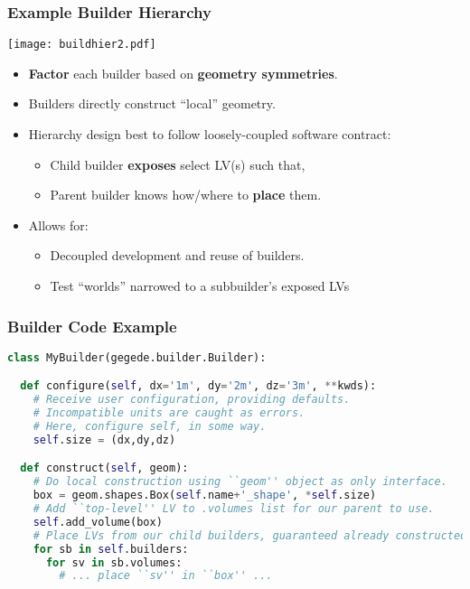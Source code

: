 \documentclass[10pt,xcolor=dvipsnames]{beamer}
\begin{document}
\begin{frame}[fragile]
  \frametitle{Example Builder Hierarchy}
  \vspace{-5mm}
  \begin{center}
    \texttt{[image: buildhier2.pdf]}    
  \end{center}
  \vspace{-5mm}
  
  \begin{itemize}\footnotesize
  \item \textbf{Factor} each builder based on \textbf{geometry symmetries}.
  \item Builders directly construct ``local'' geometry.
  \item Hierarchy design best to follow loosely-coupled software contract:
    \begin{itemize}\scriptsize
    \item Child builder \textbf{exposes} select LV(s) such that,
    \item Parent builder knows how/where to \textbf{place} them.
    \end{itemize}
  \item Allows for:
    \begin{itemize}\scriptsize
    \item Decoupled development and reuse of builders.
    \item Test ``worlds'' narrowed to a subbuilder's exposed LVs
    \end{itemize}
  \end{itemize}
\end{frame}

\begin{frame}[fragile]
  \frametitle{Builder Code Example}

  \footnotesize

  \begin{lstlisting}[language=Python]
class MyBuilder(gegede.builder.Builder):

  def configure(self, dx='1m', dy='2m', dz='3m', **kwds):
    # Receive user configuration, providing defaults.
    # Incompatible units are caught as errors.
    # Here, configure self, in some way.
    self.size = (dx,dy,dz)

  def construct(self, geom):
    # Do local construction using ``geom'' object as only interface.
    box = geom.shapes.Box(self.name+'_shape', *self.size)
    # Add ``top-level'' LV to .volumes list for our parent to use.
    self.add_volume(box)   
    # Place LVs from our child builders, guaranteed already constructed.
    for sb in self.builders:
      for sv in sb.volumes:
        # ... place ``sv'' in ``box'' ...
  \end{lstlisting}

\end{frame}
\end{document}
